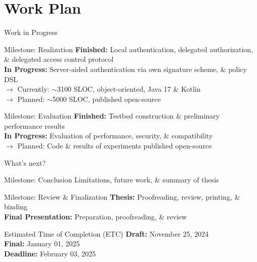 \documentclass[en]{sdqbeamer}
\begin{document}
\section{Work Plan}
\begin{frame}{Work in Progress}
    \begin{blueblock}{Milestone: Realization}
        \textbf{Finished:} Local authentication, delegated authorization, \& delegated access control protocol 
        \\\textbf{In Progress:}  Server-aided authentication via own signature scheme, \& policy DSL
        \\$\rightarrow$ Currently: $\sim$3100 SLOC, object-oriented, Java 17 \& Kotlin
        \\$\rightarrow$ Planned: $\sim$5000 SLOC, published open-source
    \end{blueblock}
    \begin{blueblock}{Milestone: Evaluation}
        \textbf{Finished:} Testbed construction \& preliminary performance results
        \\\textbf{In Progress:} Evaluation of performance, security, \& compatibility
        \\$\rightarrow$ Planned: Code \& results of experiments published open-source
    \end{blueblock}
\end{frame}
\begin{frame}{What's next?}
    \begin{blueblock}{Milestone: Conclusion}
        Limitations, future work, \& summary of thesis
    \end{blueblock}
    \begin{blueblock}{Milestone: Review \& Finalization}
        \textbf{Thesis:} Proofreading, review, printing, \& binding 
        \\\textbf{Final Presentation:} Preparation, proofreading, \& review
    \end{blueblock}
    \begin{redblock}{Estimated Time of Completion (ETC)}
        \textbf{Draft:} November 25, 2024
        \\\textbf{Final:} January 01, 2025
        \\\textbf{Deadline:} February 03, 2025
    \end{redblock}
\end{frame}
\end{document}
